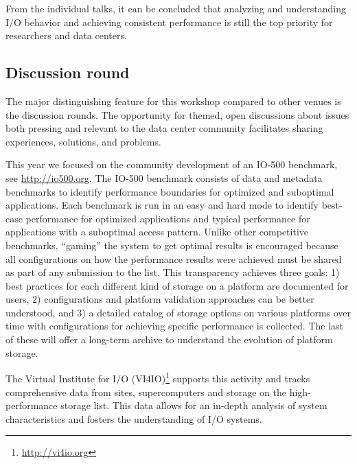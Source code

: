\documentclass{llncs}
\begin{document}
From the individual talks, it can be concluded that analyzing and understanding I/O behavior and achieving consistent performance is still the top priority for researchers and data centers.


\subsection{Discussion round}

The major distinguishing feature for this workshop compared to other venues is the discussion rounds.
The opportunity for themed, open discussions about issues both pressing and relevant to the data center
community facilitates sharing experiences, solutions, and problems.

This year we focused on the community development of an IO-500 benchmark, see \url{http://io500.org}.
The IO-500 benchmark consists of data and metadata benchmarks to identify performance boundaries for optimized and suboptimal applications.
Each benchmark is run in an easy and hard mode to identify best-case performance for optimized applications and typical performance for applications with a suboptimal access pattern. Unlike other competitive benchmarks, ``gaming'' the system to
get optimal results is encouraged because all configurations on how the performance results were achieved must be shared as part of any submission to the list. This transparency achieves three goals: 1) best practices for each different kind of storage on a platform are documented for users, 2) configurations and platform validation approaches can be better understood, and 3) a detailed catalog of storage options on various platforms over time with configurations for achieving specific performance is collected. The last of these will offer a long-term archive to understand the evolution of platform storage.

The Virtual Institute for I/O (VI4IO)\footnote{\url{http://vi4io.org}} supports this activity and tracks comprehensive data from sites, supercomputers and storage on the high-performance storage list.
This data allows for an in-depth analysis of system characteristics and fosters the understanding of I/O systems.



\end{document}
